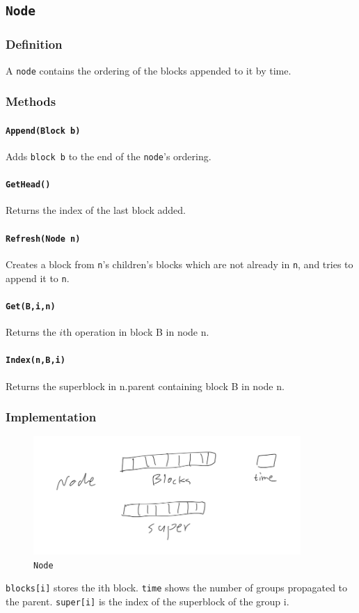\documentclass[12pt]{article}
\begin{document}
\subsection{\texttt{Node}}
\subsubsection{Definition}
A \texttt{node} contains the ordering of the blocks appended to it by time.
\subsubsection{Methods}
\paragraph{\texttt{Append(Block b)}}
Adds \texttt{block b} to the end of the \texttt{node}'s ordering.
\paragraph{\texttt{GetHead()}} Returns the index of the last block added.
\paragraph{\texttt{Refresh(Node n)}}
Creates a block from \texttt{n}'s children's blocks which are not already in \texttt{n}, and tries to append it to \texttt{n}.
\paragraph{\texttt{Get(B,i,n)}} Returns the $i$th operation in block B in node n.
\paragraph{\texttt{Index(n,B,i)}} Returns the superblock in n.parent containing block B in node n.
\subsubsection{Implementation}
\begin{figure}[hbt]
  \center\includegraphics[width=4in]{pics/node}
  \caption{\texttt{Node}}
\end{figure}
\texttt{blocks[i]} stores the ith block. \texttt{time} shows the number of groups propagated to the parent. \texttt{super[i]} is the index of the superblock of the group i.
\end{document}
